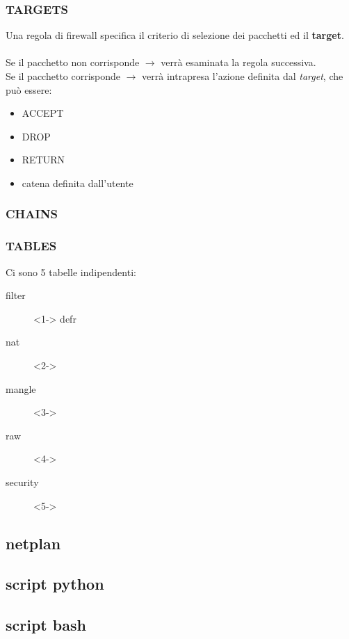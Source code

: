 \documentclass{beamer}
\begin{document}
\begin{frame}
    \frametitle{TARGETS}

    Una regola di firewall specifica il criterio di selezione dei pacchetti ed il \textbf{target}.
    \\~\\
    Se il pacchetto non corrisponde $\rightarrow$ verrà esaminata la regola successiva.\\
    Se il pacchetto corrisponde $\rightarrow$ verrà intrapresa l'azione definita dal \textit{target}, che può essere:
    \begin{itemize}
        \item ACCEPT
        \item DROP
        \item RETURN
        \item catena definita dall'utente
    \end{itemize}

\end{frame}


\begin{frame}
    \frametitle{CHAINS}

    

\end{frame}


\begin{frame}
    \frametitle{TABLES}
    Ci sono 5 tabelle indipendenti:
    \begin{description}
        \item[filter]<1-> defr
        \item[nat]<2->
        \item[mangle]<3->
        \item[raw]<4->
        \item[security]<5->    
    \end{description}
\end{frame}

\subsection*{netplan}


\subsection*{script python}


\subsection*{script bash}
\end{document}
